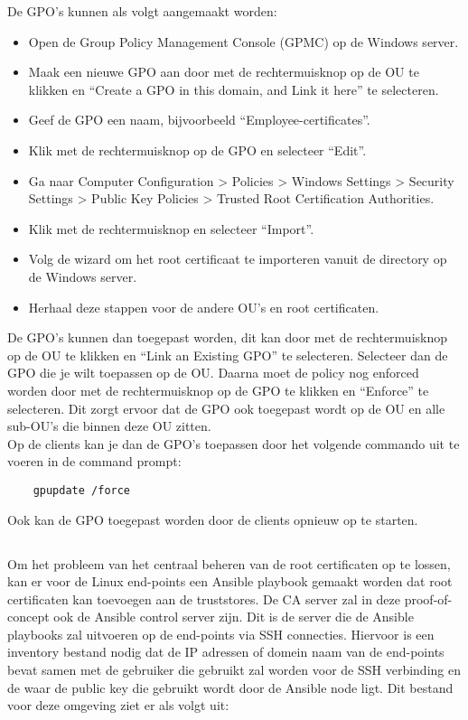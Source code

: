 De GPO's kunnen als volgt aangemaakt worden:
\begin{itemize}
    \item Open de Group Policy Management Console (GPMC) op de Windows server.
    \item Maak een nieuwe GPO aan door met de rechtermuisknop op de OU te klikken en ``Create a GPO in this domain, and Link it here'' te selecteren.
    \item Geef de GPO een naam, bijvoorbeeld ``Employee-certificates''.
    \item Klik met de rechtermuisknop op de GPO en selecteer ``Edit''.
    \item Ga naar Computer Configuration > Policies > Windows Settings > Security Settings > Public Key Policies > Trusted Root Certification Authorities.
    \item Klik met de rechtermuisknop en selecteer ``Import''.
    \item Volg de wizard om het root certificaat te importeren vanuit de directory op de Windows server.
    \item Herhaal deze stappen voor de andere OU's en root certificaten.
\end{itemize}

De GPO's kunnen dan toegepast worden, dit kan door met de rechtermuisknop op de OU te klikken en ``Link an Existing GPO'' te selecteren. Selecteer dan de GPO die je wilt toepassen op de OU. Daarna moet de policy nog enforced worden door met de rechtermuisknop op de GPO te klikken en ``Enforce'' te selecteren. Dit zorgt ervoor dat de GPO ook toegepast wordt op de OU en alle sub-OU's die binnen deze OU zitten. \\

Op de clients kan je dan de GPO's toepassen door het volgende commando uit te voeren in de command prompt:
\begin{verbatim}
    gpupdate /force
\end{verbatim}
Ook kan de GPO toegepast worden door de clients opnieuw op te starten. 

\pagebreak

\subsection{}
\label{subsec:Oplossing_voor_Linux_end-points_met_Ansible}

Om het probleem van het centraal beheren van de root certificaten op te lossen, kan er voor de Linux end-points een Ansible playbook gemaakt worden dat root certificaten kan toevoegen aan de truststores.
De CA server zal in deze proof-of-concept ook de Ansible control server zijn. Dit is de server die de Ansible playbooks zal uitvoeren op de end-points via SSH connecties.
Hiervoor is een inventory bestand nodig dat de IP adressen of domein naam van de end-points bevat samen met de gebruiker die gebruikt zal worden voor de SSH verbinding en de waar de public key die gebruikt wordt door de Ansible node ligt. Dit bestand voor deze omgeving ziet er als volgt uit: \\

